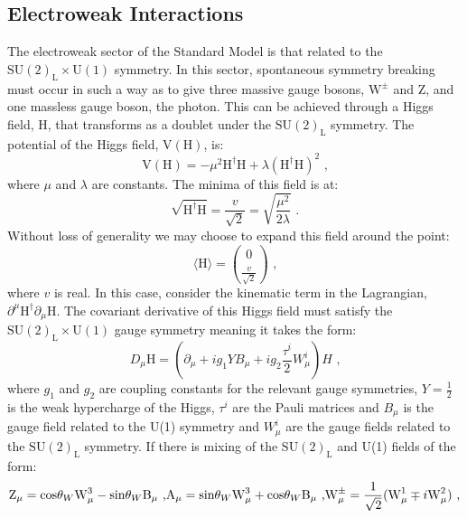 \subsection{Electroweak Interactions}
The electroweak sector of the Standard Model is that related to the $\text{SU}(2)_{\text{L}} \times \text{U}(1)$ symmetry.  In this sector, spontaneous symmetry breaking must occur in such a way as to give three massive gauge bosons,  $\text{W}^{\pm}$ and Z, and one massless gauge boson, the photon.  This can be achieved through a Higgs field, H, that transforms as a doublet under the $\text{SU}(2)_{\text{L}}$ symmetry.  The potential of the Higgs field, $\text{V}(\text{H})$, is:
%
\begin{equation}
\text{V}(\text{H}) = -\mu^{2}\text{H}^{\dagger}\text{H} + \lambda (\text{H}^{\dagger}\text{H})^{2} \text{ ,}
\end{equation}
%
\noindent where $\mu$ and $\lambda$ are constants.  The minima of this field is at:
%
\begin{equation}
\sqrt{\text{H}^{\dagger}\text{H}} = \frac{v}{\sqrt{2}} = \sqrt{\frac{\mu^{2}}{2\lambda}} \text{ .}
\end{equation}
%
\noindent Without loss of generality we may choose to expand this field around the point:
%
\begin{equation}
\langle \text{H} \rangle = \binom{0}{\frac{v}{\sqrt{2}}} \text{ ,}
\end{equation}
%
\noindent where $v$ is real.  In this case, consider the kinematic term in the Lagrangian, $\partial^{\mu} \text{H}^{\dagger} \partial_{\mu} \text{H}$.  The covariant derivative of this Higgs field must satisfy the $\text{SU}(2)_{\text{L}} \times \text{U}(1)$ gauge symmetry meaning it takes the form:
%
\begin{equation}
D_{\mu} \text{H} = (\partial_{\mu} + ig_{1}YB_{\mu} + ig_{2}\frac{\tau^{i}}{2}W^{i}_{\mu})H \text{ ,}
\end{equation}
%
\noindent where $g_{1}$ and $g_{2}$ are coupling constants for the relevant gauge symmetries, $Y = \frac{1}{2}$ is the weak hypercharge of the Higgs, $\tau^{i}$ are the Pauli matrices and $B_{\mu}$ is the gauge field related to the U(1) symmetry and $W^{i}_{\mu}$ are the gauge fields related to the $\text{SU}(2)_{\text{L}}$ symmetry.  If there is mixing of the $\text{SU}(2)_{\text{L}}$ and U(1) fields of the form:
%
\begin{equation}
\text{Z}_{\mu} = \text{cos}{\theta_{W}} \text{W}^{3}_{\mu} - \text{sin}{\theta_{W}} \text{B}_{\mu} \text{ ,}\\
\text{A}_{\mu} = \text{sin}{\theta_{W}} \text{W}^{3}_{\mu} + \text{cos}{\theta_{W}} \text{B}_{\mu} \text{ ,}\\
\text{W}^{\pm}_{\mu} = \frac{1}{\sqrt{2}}(\text{W}^{1}_{\mu} \mp i \text{W}^{2}_{\mu}) \text{ ,}
\end{equation}

